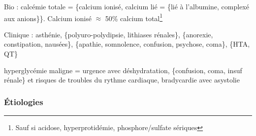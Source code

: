 \documentclass[11pt]{article}
\begin{document}
Bio : calcémie totale = \{calcium ionisé, calcium lié = \{lié à l'albumine,
complexé aux anions\}\}. Calcium ionisé \(\approx\) 50\% calcium total\footnote{Sauf si acidose, hyperprotidémie, \inc phosphore/sulfate sériques}

Clinique : asthénie, \{polyuro-polydipsie, lithiases rénales\}, \{anorexie,
constipation, nausées\}, \{apathie, somnolence, confusion, psychose, coma\}, \{HTA,
\dec QT\}

\danger hyperglycémie maligne = urgence \faBomb{} avec déshydratation, \{confusion,
coma, insuf rénale\} et risques de troubles du rythme cardiaque, bradycardie avec asystolie

\subsubsection{Étiologies}
\label{sec:orgdfb3382}
\end{document}
